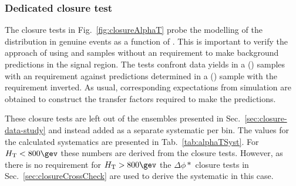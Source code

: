 
\subsubsection{Dedicated \alphat closure test}

The closure tests in Fig.~\ref{fig:closureAlphaT} probe the
modelling of the \alphat distribution in genuine \met events as a
function of \scalht. This is important to verify the approach of using
\mj and \mmj samples without an \alphat requirement to
make background predictions in the signal region. The tests confront
data yields in a \mj (\mmj) samples with an \alphat requirement against
predictions determined in a \mj (\mmj) sample with the \alphat requirement
inverted. As usual, corresponding expectations from simulation are
obtained to construct the transfer factors required to make the
predictions.

These closure tests are left out of the ensembles presented in
Sec.~\ref{sec:closure-data-study} and instead added as a separate
systematic per \scalht bin. The values for the calculated systematics
are presented in Tab.~\ref{tab:alphaTSyst}. For $\scalht<800\gev$
these numbers are derived from the \alphat closure tests. However, as
there is no \alphat requirement for $\scalht>800\gev$ the $\Delta\phi
*$ closure tests in Sec.~\ref{sec:closureCrossCheck} are used to
derive the systematic in this case.

